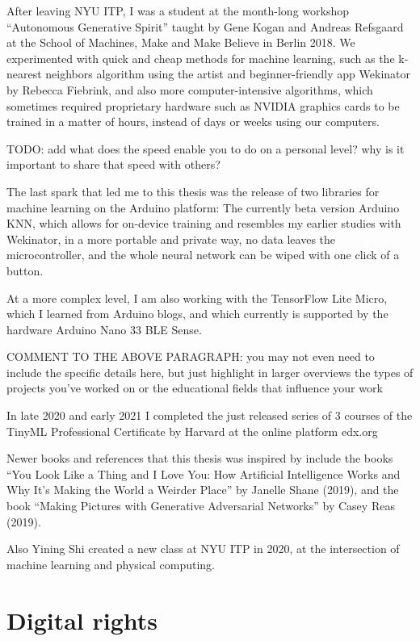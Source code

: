 After leaving NYU ITP, I was a student at the month-long workshop “Autonomous Generative Spirit” taught by Gene Kogan and Andreas Refsgaard at the School of Machines, Make and Make Believe in Berlin 2018. We experimented with quick and cheap methods for machine learning, such as the k-nearest neighbors algorithm using the artist and beginner-friendly app Wekinator by Rebecca Fiebrink, and also more computer-intensive algorithms, which sometimes required proprietary hardware such as NVIDIA graphics cards to be trained in a matter of hours, instead of days or weeks using our computers.

TODO: add what does the speed enable you to do on a personal level? why is it important to share that speed with others?

The last spark that led me to this thesis was the release of two libraries for machine learning on the Arduino platform: The currently beta version Arduino KNN, which allows for on-device training and resembles my earlier studies with Wekinator, in a more portable and private way, no data leaves the microcontroller, and the whole neural network can be wiped with one click of a button.

At a more complex level, I am also working with the TensorFlow Lite Micro, which I learned from Arduino blogs, and which currently is supported by the hardware Arduino Nano 33 BLE Sense.

COMMENT TO THE ABOVE PARAGRAPH: you may not even need to include the specific details here, but just highlight in larger overviews the types of projects you've worked on or the educational fields that influence your work

In late 2020 and early 2021 I completed the just released series of 3 courses of the TinyML Professional Certificate by Harvard at the online platform edx.org

Newer books and references that this thesis was inspired by include the books “You Look Like a Thing and I Love You: How Artificial Intelligence Works and Why It's Making the World a Weirder Place” by Janelle Shane (2019), and the book “Making Pictures with Generative Adversarial Networks” by Casey Reas (2019).

Also Yining Shi created a new class at NYU ITP in 2020, at the intersection of machine learning and physical computing.

\section{Digital rights}

